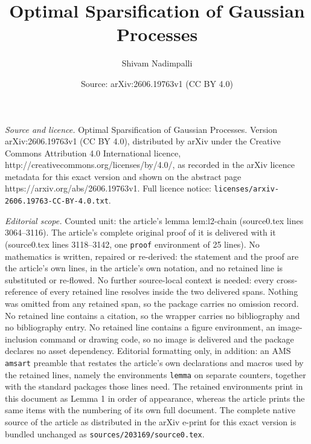 \documentclass[10pt,a4paper]{amsart}
\title{Optimal Sparsification of Gaussian Processes}
\author{Shivam Nadimpalli}
\date{Source: arXiv:2606.19763v1 (CC BY 4.0)}
\begin{document}
\maketitle

\noindent\emph{Source and licence.} Optimal Sparsification of Gaussian Processes. Version arXiv:2606.19763v1 (CC BY 4.0), distributed by arXiv under the Creative Commons Attribution 4.0 International licence, http://creativecommons.org/licenses/by/4.0/, as recorded in the arXiv licence metadata for this exact version and shown on the abstract page https://arxiv.org/abs/2606.19763v1. Full licence notice: \texttt{licenses/arxiv-2606.19763-CC-BY-4.0.txt}.\par\smallskip

\noindent\textit{Editorial scope.} Counted unit: the article's lemma lem:l2-chain (source0.tex lines 3064--3116). The article's complete original proof of it is delivered with it (source0.tex lines 3118--3142, one \texttt{proof} environment of 25 lines). No mathematics is written, repaired or re-derived: the statement and the proof are the article's own lines, in the article's own notation, and no retained line is substituted or re-flowed.  No further source-local context is needed: every cross-reference of every retained line resolves inside the two delivered spans.  Nothing was omitted from any retained span, so the package carries no omission record.  No retained line contains a citation, so the wrapper carries no bibliography and no bibliography entry.  No retained line contains a figure environment, an image-inclusion command or drawing code, so no image is delivered and the package declares no asset dependency.  Editorial formatting only, in addition: an AMS \texttt{amsart} preamble that restates the article's own declarations and macros used by the retained lines, namely the environments \texttt{lemma} on separate counters, together with the standard packages those lines need.  The retained environments print in this document as Lemma 1 in order of appearance, whereas the article prints the same items with the numbering of its own full document.  The complete native source of the article as distributed in the arXiv e-print for this exact version is bundled unchanged as \texttt{sources/203169/source0.tex}.
\end{document}
